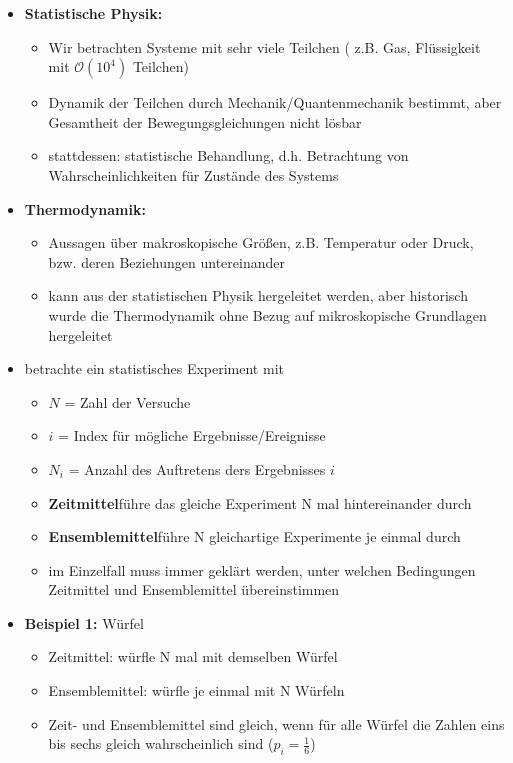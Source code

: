 \documentclass[ngerman]{scrartcl}
\begin{document}
		\begin{itemize}
			\item \textbf{Statistische Physik:}\begin{itemize}
					\item Wir betrachten Systeme mit sehr viele Teilchen ( z.B. Gas, 									Flüssigkeit mit $\mathcal{O}(10^4)$ Teilchen)
					\item Dynamik der Teilchen durch Mechanik/Quantenmechanik bestimmt, aber Gesamtheit der Bewegungsgleichungen nicht lösbar
					\item stattdessen: statistische Behandlung, d.h. Betrachtung von Wahrscheinlichkeiten für Zustände des Systems
					
			\end{itemize}
				\item \textbf{Thermodynamik:}\begin{itemize}
						\item Aussagen über makroskopische Größen, z.B. Temperatur oder Druck, bzw. deren Beziehungen untereinander 
						\item kann aus der statistischen Physik hergeleitet werden, aber historisch wurde die Thermodynamik ohne Bezug auf mikroskopische Grundlagen hergeleitet
			\end{itemize}
			\item betrachte ein statistisches Experiment mit\begin{itemize}
					\item $N$ = Zahl der Versuche
					\item $i$ = Index für mögliche Ergebnisse/Ereignisse
					\item $N_i$ = Anzahl des Auftretens ders Ergebnisses $i$
					\item \textbf{Zeitmittel}\dotso führe das gleiche Experiment N mal hintereinander durch
					\item \textbf{Ensemblemittel}\dotso führe N gleichartige Experimente je einmal durch
					\item im Einzelfall muss immer geklärt werden, unter welchen Bedingungen Zeitmittel und Ensemblemittel übereinstimmen 
			\end{itemize}
			\item \textbf{Beispiel 1:} Würfel\begin{itemize}
						\item Zeitmittel: würfle N mal mit demselben Würfel
						\item Ensemblemittel: würfle je einmal mit N Würfeln
						\item Zeit- und Ensemblemittel sind gleich, wenn für alle Würfel die Zahlen eins bis sechs gleich wahrscheinlich sind ($p_i = \frac{1}{6}$)

\end{itemize}
\end{itemize}
\end{document}
